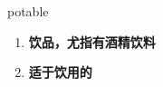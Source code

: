 
\begin{frame}
{\huge potable}
\begin{center}
\begin{enumerate}\Large
  \item \textbf{饮品，尤指有酒精饮料}
  \item \textbf{适于饮用的}
\end{enumerate}
\end{center}
\end{frame}
